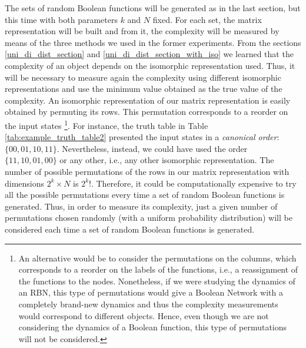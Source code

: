 The sets of random Boolean functions will be generated as in the last section, but this time with both parameters $k$ and $N$ fixed. For each set, the matrix representation will be built and from it, the complexity will be measured by means of the three methods we used in the former experiments. From the sections \ref{uni_di_dist_section} and \ref{uni_di_dist_section_with_iso} we learned that the complexity of an object depends on the isomorphic representation used. Thus, it will be necessary to measure again the complexity using different isomorphic representations and use the minimum value obtained as the true value of the complexity. An isomorphic representation of our matrix representation is easily obtained by permuting its rows. This permutation corresponds to a reorder on the input states \footnote{An alternative would be to consider the permutations on the columns, which corresponds to a reorder on the labels of the functions, i.e., a reassignment of the functions to the nodes. Nonetheless, if we were studying the dynamics of an RBN, this type of permutations would give a Boolean Network with a completely brand-new dynamics and thus the complexity measurements would correspond to different objects. Hence, even though we are not considering the dynamics of a Boolean function, this type of permutations will not be considered. }. For instance, the truth table in Table \ref{tab:example_truth_table2} presented the input states in a \textit{canonical order}: $\{ 00,01,10,11 \}$. Nevertheless, instead, we could have used the order $\{ 11,10,01,00 \}$ or any other, i.e., any other isomorphic representation. The number of possible permutations of the rows in our matrix representation with dimensions $2^{k} \times N$ is $2^{k} !$. Therefore, it could be computationally expensive to try all the possible permutations every time a set of random Boolean functions is generated. Thus, in order to measure its complexity, just a given number of permutations chosen randomly (with a uniform probability distribution) will be considered each time a set of random Boolean functions is generated.\\

